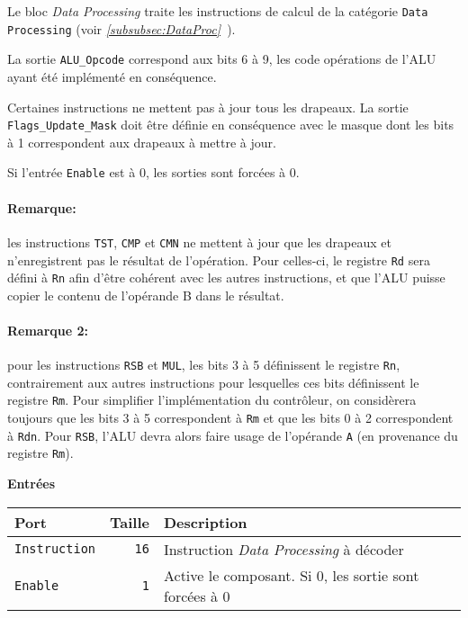 \documentclass{article}
\begin{document}
    Le bloc \textit{Data Processing} traite les instructions de calcul de la catégorie \texttt{Data Processing} (voir \textit{\ref{subsubsec:DataProc}~}).

    La sortie \texttt{ALU\_Opcode} correspond aux bits 6 à 9, les code opérations de l'ALU ayant été implémenté en conséquence.

    Certaines instructions ne mettent pas à jour tous les drapeaux.
    La sortie \texttt{Flags\_Update\_Mask} doit être définie en conséquence avec le masque dont les bits à 1 correspondent aux drapeaux à mettre à jour.

    Si l'entrée \texttt{Enable} est à 0, les sorties sont forcées à 0.

    \paragraph{Remarque:} les instructions \texttt{TST}, \texttt{CMP} et \texttt{CMN} ne mettent à jour que les drapeaux et n'enregistrent pas le résultat de l'opération.
    Pour celles-ci, le registre \texttt{Rd} sera défini à \texttt{Rn} afin d'être cohérent avec les autres instructions, et que l'ALU puisse copier le contenu de l'opérande B dans le résultat.

    \paragraph{Remarque 2:} pour les instructions \texttt{RSB} et \texttt{MUL}, les bits 3 à 5 définissent le registre \texttt{Rn}, contrairement aux autres instructions pour lesquelles ces bits définissent le registre \texttt{Rm}.
    Pour simplifier l'implémentation du contrôleur, on considèrera toujours que les bits 3 à 5 correspondent à \texttt{Rm} et que les bits 0 à 2 correspondent à \texttt{Rdn}.
    Pour \texttt{RSB}, l'ALU devra alors faire usage de l'opérande \texttt{A} (en provenance du registre \texttt{Rm}).



    \textbf{Entrées}\\

    \begin{tabular}{|l|r|l|}
        \hline
        \textbf{Port}        & \textbf{Taille} & \textbf{Description}                           \\
        \hline

        \texttt{Instruction} & \texttt{16}     & Instruction \textit{Data Processing} à décoder \\
        \hline
        \texttt{Enable} & \texttt{1} & Active le composant.
        Si 0, les sortie sont forcées à 0 \\


        \hline
    \end{tabular}
\end{document}

